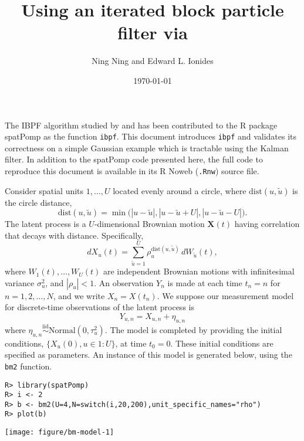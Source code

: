 \documentclass[12pt]{article}\usepackage[]{graphicx}\usepackage[]{xcolor}
\title{Using an iterated block particle filter via \pkg{spatPomp}}
\author{Ning Ning and Edward L. Ionides}
\date{\today}
\makeatletter
\newenvironment{kframe}{%
 \def\at@end@of@kframe{}%
 \ifinner\ifhmode%
  \def\at@end@of@kframe{\end{minipage}}%
  \begin{minipage}{\columnwidth}%
 \fi\fi%
 \def\FrameCommand##1{\hskip\@totalleftmargin \hskip-\fboxsep
 \colorbox{shadecolor}{##1}\hskip-\fboxsep
     \hskip-\linewidth \hskip-\@totalleftmargin \hskip\columnwidth}%
 \MakeFramed {\advance\hsize-\width
   \@totalleftmargin\z@ \linewidth\hsize
   \@setminipage}}%
 {\par\unskip\endMakeFramed%
 \at@end@of@kframe}
\newenvironment{knitrout}{}{} %
\newcommand\proglang[1]{\textsf{#1}}
\newcommand\code[1]{\texttt{#1}}
\newcommand{\pkg}[1]{{\fontseries{b}\selectfont #1}}
\newcommand\unit{u}
\newcommand\altUnit{\tilde{u}}
\newcommand\Unit{U}
\renewcommand\time{n}
\renewcommand\vec[1]{\boldsymbol{#1}}
\newcommand\normal{{\mathrm{Normal}}}
\newcommand\dist{\mathrm{dist}}
\makeatother
\begin{document}
\maketitle

The IBPF algorithm studied by \citet{ning21-ibpf} and \citet{ionides22} has been contributed to the \proglang{R} package \pkg{spatPomp} \citep{asfaw21cran,asfaw21arxiv} as the function  \code{ibpf}.
This document introduces \code{ibpf} and validates its correctness on a simple Gaussian example which is tractable using the Kalman filter.
In addition to the \pkg{spatPomp} code presented here, the full code to reproduce this document is available in its R Noweb (\code{.Rnw}) source file. 

Consider spatial units $1,\dots,\Unit$ located evenly around a circle, where $\dist(\unit,\altUnit)$ is the circle distance,
\[
\dist(\unit,\altUnit)
= \min\big(|\unit-\altUnit|, |\unit-\altUnit+\Unit|, |\unit-\altUnit-\Unit|\big).
\]
The latent process is a $\Unit$-dimensional Brownian motion $\vec{X}(t)$ having correlation that decays with distance.
Specifically,
\[
dX_\unit(t)= \sum_{\altUnit=1}^{\Unit} \rho_{\unit}^{\dist(\unit,\altUnit)} \, dW_{\altUnit}(t),
\]
where $W_{1}(t),\dots,W_{\Unit}(t)$ are independent Brownian motions with infinitesimal variance $\sigma_{\unit}^2$, and $|\rho_{\unit}| <1$.
An observation $Y_n$ is made at each time $t_n=n$ for $n=1,2,\dots,N$, and we write $X_n=X(t_n)$.
We suppose our measurement model for discrete-time observations of the latent process is
\[
Y_{\unit,\time}=X_{\unit,\time} + \eta_{\unit,\time}
\]
where  $\eta_{\unit,\time}\overset{\text{iid}}{\sim} \normal(0,\tau_{\unit}^2)$.
The model is completed by providing the initial conditions, $\{X_\unit(0), \unit \in 1:\Unit \}$, at time $t_0=0$.
These initial conditions are specified as parameters.
An instance of this model is generated below, using the \code{bm2} function.



\begin{knitrout}
\color{fgcolor}\begin{kframe}
\begin{verbatim}
R> library(spatPomp)
R> i <- 2
R> b <- bm2(U=4,N=switch(i,20,200),unit_specific_names="rho")
R> plot(b)
\end{verbatim}
\end{kframe}

\texttt{[image: figure/bm-model-1]} \hfill{}


\end{knitrout}
\end{document}
